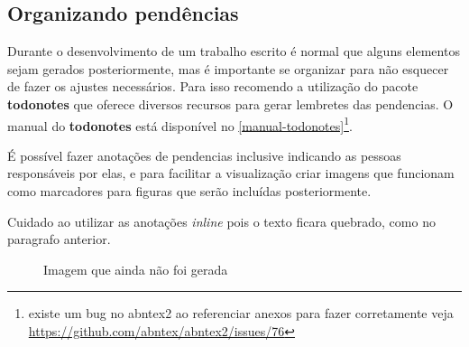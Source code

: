 \subsection{Organizando pendências}

Durante o desenvolvimento de um trabalho escrito é normal que alguns elementos sejam gerados posteriormente, mas é importante se organizar para não esquecer de fazer os ajustes necessários. Para isso recomendo a utilização do pacote \textbf{todonotes} que oferece diversos recursos para gerar lembretes das pendencias. O manual do \textbf{todonotes} está disponível no \autoref{manual-todonotes}\footnote{existe um bug no abntex2 ao referenciar anexos para fazer corretamente veja \url{https://github.com/abntex/abntex2/issues/76}}.

É possível fazer anotações de pendencias inclusive indicando as pessoas responsáveis por elas, %
 e para facilitar a visualização criar imagens que funcionam como marcadores para figuras que serão incluídas posteriormente.

Cuidado ao utilizar as anotações \emph{inline} pois o texto ficara quebrado, como no paragrafo anterior.


\begin{figure}[htb]
    \centering
	\caption{\label{fig_todo1}Imagem que ainda não foi gerada}
\end{figure}


